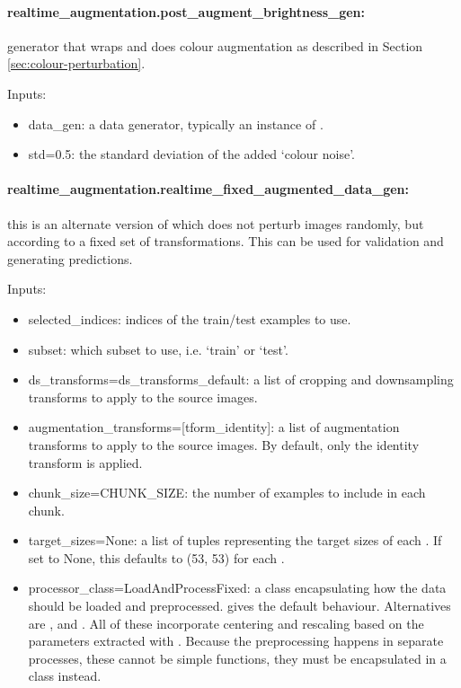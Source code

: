 \documentclass[a4paper,10pt]{article}
\begin{document}
\paragraph{realtime\_augmentation.post\_augment\_brightness\_gen:} generator that wraps  and does colour augmentation as described in Section \ref{sec:colour-perturbation}.

 Inputs:
 \begin{itemize}
  \item{data\_gen:} a data generator, typically an instance of .
  \item{std=0.5:} the standard deviation of the added `colour noise'.
 \end{itemize}
 
 \paragraph{realtime\_augmentation.realtime\_fixed\_augmented\_data\_gen:} this is an alternate version of  which does not perturb images randomly, but according to a fixed set of transformations. This can be used for validation and generating predictions.

Inputs:
 \begin{itemize}
  \item{selected\_indices:} indices of the train/test examples to use.
  \item{subset:} which subset to use, i.e. `train' or `test'.
  \item{ds\_transforms=ds\_transforms\_default:} a list of cropping and downsampling transforms to apply to the source images.
  \item{augmentation\_transforms=[tform\_identity]:} a list of augmentation transforms to apply to the source images. By default, only the identity transform is applied.
  \item{chunk\_size=CHUNK\_SIZE:} the number of examples to include in each chunk.
  \item{target\_sizes=None:} a list of tuples representing the target sizes of each . If set to None, this defaults to (53, 53) for each .
  \item{processor\_class=LoadAndProcessFixed:} a class encapsulating how the data should be loaded and preprocessed.  gives the default behaviour. Alternatives are ,  and . All of these incorporate centering and rescaling based on the parameters extracted with . Because the preprocessing happens in separate processes, these cannot be simple functions, they must be encapsulated in a class instead.
 \end{itemize}
 
\end{document}
